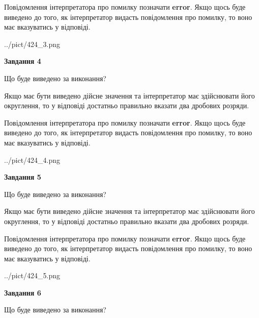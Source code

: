 \documentclass[12pt, ukrainian]{article}
\begin{document}
{\begin {Large}
Повідомлення інтерпретатора про помилку позначати \textbf{error}.
Якщо щось буде виведено до того, як інтерпретатор видасть повідомлення про помилку, 
то воно має вказуватись у відповіді. \par

\begin{center}
	{../pict/424_3.png}
\end{center}
\newpage

{\begin {center}\textbf{Завдання 4}\end {center}}\par
Що буде виведено за виконання? \par

Якщо має бути виведено дійсне значення та інтерпретатор має здійснювати його округлення, 
то у відповіді достатньо правильно вказати два дробових розряди.

Повідомлення інтерпретатора про помилку позначати \textbf{error}.
Якщо щось буде виведено до того, як інтерпретатор видасть повідомлення про помилку, 
то воно має вказуватись у відповіді. \par

\begin{center}
	{../pict/424_4.png}
\end{center}
\newpage

{\begin {center}\textbf{Завдання 5}\end {center}}\par
Що буде виведено за виконання? \par

Якщо має бути виведено дійсне значення та інтерпретатор має здійснювати його округлення, 
то у відповіді достатньо правильно вказати два дробових розряди.

Повідомлення інтерпретатора про помилку позначати \textbf{error}.
Якщо щось буде виведено до того, як інтерпретатор видасть повідомлення про помилку, 
то воно має вказуватись у відповіді. \par

\begin{center}
	{../pict/424_5.png}
\end{center}
\newpage

{\begin {center}\textbf{Завдання 6}\end {center}}\par
Що буде виведено за виконання? \par


\end{Large}}
\end{document}
